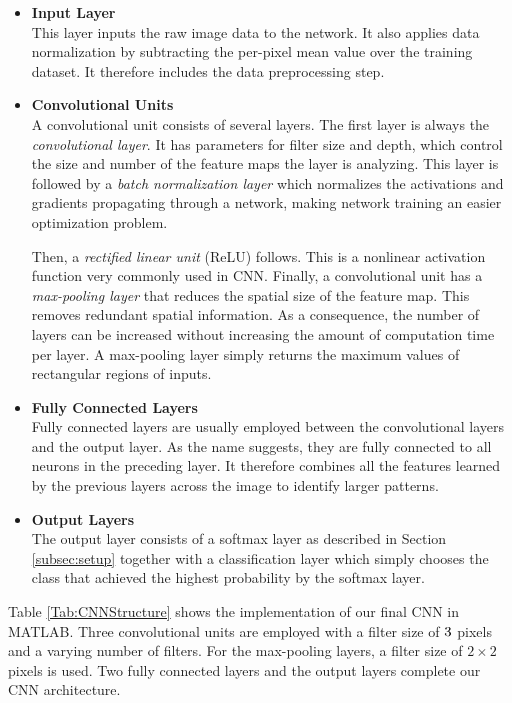 \begin{itemize}

	\item \textbf{Input Layer}\\
	This layer inputs the raw image data to the network. It also applies data normalization by subtracting the per-pixel mean value over the training dataset. It therefore includes the data preprocessing step.

	\item \textbf{Convolutional Units}\\
	A convolutional unit consists of several layers. The first layer is always the \textit{convolutional layer}. It has parameters for filter size and depth, which control the size and number of the feature maps the layer is analyzing. This layer is followed by a \textit{batch normalization layer} which normalizes the activations and gradients propagating through a network, making network training an easier optimization problem.

	Then, a \textit{rectified linear unit} (ReLU) follows. This is a nonlinear activation function very commonly used in CNN. Finally, a convolutional unit has a \textit{max-pooling layer} that reduces the spatial size of the feature map. This removes redundant spatial information. As a consequence, the number of layers can be increased without increasing the amount of computation time per layer. A max-pooling layer simply returns the maximum values of rectangular regions of inputs.

	\item \textbf{Fully Connected Layers}\\
	Fully connected layers are usually employed between the convolutional layers and the output layer. As the name suggests, they are fully connected to all neurons in the preceding layer. It therefore combines all the features learned by the previous layers across the image to identify larger patterns.

	\item \textbf{Output Layers}\\
	The output layer consists of a softmax layer as described in Section \ref{subsec:setup} together with a classification layer which simply chooses the class that achieved the highest probability by the softmax layer.

\end{itemize}

Table \ref{Tab:CNNStructure} shows the implementation of our final CNN in MATLAB. Three convolutional units are employed with a filter size of $3\time3$ pixels and a varying number of filters. For the max-pooling layers, a filter size of $2\times2$ pixels is used. Two fully connected layers and the output layers complete our CNN architecture.

